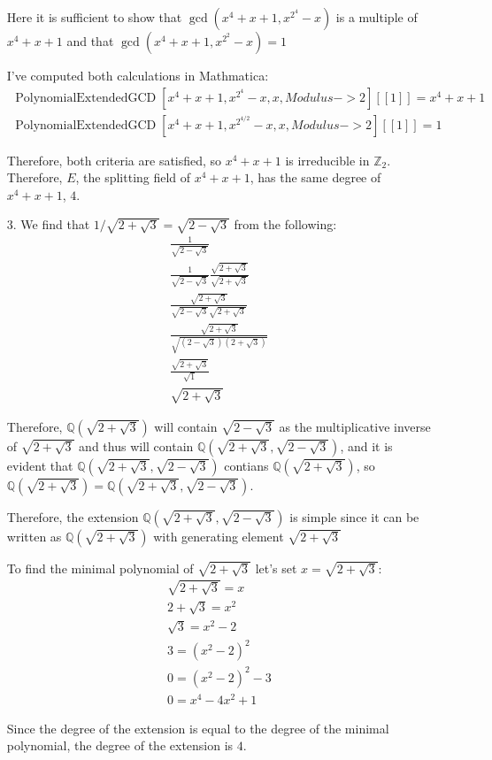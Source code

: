 \documentclass{article}
\begin{document}
\begin{enumerate}
    Here it is sufficient to show that \(\operatorname{gcd}(x^4 + x + 1, x^{2^{4}} - x)\) is a multiple of \(x^4 + x + 1\) and that \(\operatorname{gcd}(x^4 + x + 1, x^{2^{2}} - x) = 1\)
    
    I've computed both calculations in Mathmatica:
    \begin{eqnarray*}
        \operatorname{PolynomialExtendedGCD}[x^4 + x + 1, x^{2^4} - x, x, Modulus -> 2][[1]] = x^4 + x + 1 \\
        \operatorname{PolynomialExtendedGCD}[x^4 + x + 1, x^{2^{4/2}} - x, x, 
        Modulus -> 2][[1]] = 1
    \end{eqnarray*}

    Therefore, both criteria are satisfied, so \(x^4 + x + 1\) is irreducible in \(\mathbb{Z} _2\). Therefore, \(E\), the splitting field of \(x^4 + x + 1\), has the same degree of \(x^4 + x + 1\), \(4\).

    \item[3.] 
    We find that \(1/\sqrt{2 + \sqrt{3}} = \sqrt{2 - \sqrt{3}}\) from the following:
    \begin{eqnarray*}
        \frac{1}{\sqrt{2 - \sqrt{3}}} \\
        \frac{1}{\sqrt{2 - \sqrt{3}}} \frac{\sqrt{2 + \sqrt{3}}}{\sqrt{2 + \sqrt{3}}} \\
        \frac{\sqrt{2 + \sqrt{3}}}{\sqrt{2 - \sqrt{3}}\sqrt{2 + \sqrt{3}}} \\ 
        \frac{\sqrt{2 + \sqrt{3}}}{\sqrt{(2 - \sqrt{3}) (2 + \sqrt{3})}} \\
        \frac{\sqrt{2 + \sqrt{3}}}{\sqrt{1}} \\
        \sqrt{2 + \sqrt{3}}
    \end{eqnarray*}
    
    Therefore, \(\mathbb{Q} (\sqrt{2 + \sqrt{3}})\) will contain \(\sqrt{2 - \sqrt{3}}\) as the multiplicative inverse of \(\sqrt{2 + \sqrt{3}}\) and thus will contain \(\mathbb{Q} (\sqrt{2 + \sqrt{3}}, \sqrt{2 - \sqrt{3}})\), and it is evident that \(\mathbb{Q} (\sqrt{2 + \sqrt{3}}, \sqrt{2 - \sqrt{3}})\) contians \(\mathbb{Q} (\sqrt{2 + \sqrt{3}})\), so \(\mathbb{Q} (\sqrt{2 + \sqrt{3}}) = \mathbb{Q} (\sqrt{2 + \sqrt{3}}, \sqrt{2 - \sqrt{3}})\). 
    
    Therefore, the extension \(\mathbb{Q} (\sqrt{2 + \sqrt{3}}, \sqrt{2 - \sqrt{3}})\) is simple since it can be written as \(\mathbb{Q} (\sqrt{2 + \sqrt{3}})\) with generating element \(\sqrt{2 + \sqrt{3}}\) 

    To find the minimal polynomial of \(\sqrt{2 + \sqrt{3}}\) let's set \(x = \sqrt{2 + \sqrt{3}}\):
    \begin{eqnarray*}
        \sqrt{2 + \sqrt{3}} = x \\
        2 + \sqrt{3} = x^2 \\
        \sqrt{3} = x^2 - 2 \\
        3 = (x^2 - 2)^2 \\
        0 = (x^2 - 2)^2 - 3 \\
        0 = x^4 - 4x^2 + 1
    \end{eqnarray*}

    Since the degree of the extension is equal to the degree of the minimal polynomial, the degree of the extension is \(4\).
\end{enumerate}
\end{document}
